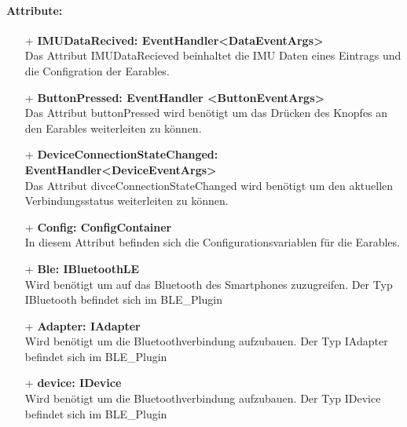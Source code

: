\documentclass[a4paper,12pt]{article}
\begin{document}
\paragraph{Attribute:}
\begin{itemize}
	\item[+] \textbf{IMUDataRecived: EventHandler<DataEventArgs>}\\Das Attribut IMUDataRecieved beinhaltet die IMU Daten eines Eintrags und die Configration der Earables.
	\item[+] \textbf{ButtonPressed: EventHandler <ButtonEventArgs>}\\ Das Attribut buttonPressed wird benötigt um das Drücken des Knopfes an den Earables weiterleiten zu können.
	\item[+] \textbf{DeviceConnectionStateChanged: EventHandler<DeviceEventArgs>}\\ Das Attribut divceConnectionStateChanged wird benötigt um den aktuellen Verbindungsstatus weiterleiten zu können.
	\item[+] \textbf{Config: ConfigContainer}\\ In diesem Attribut befinden sich die Configurationsvariablen für die Earables.
	\item[+] \textbf{Ble: IBluetoothLE}\\ Wird benötigt um auf das Bluetooth des Smartphones zuzugreifen. Der Typ IBluetooth befindet sich im BLE\_Plugin
	\item[+] \textbf{Adapter: IAdapter}\\ Wird benötigt um die Bluetoothverbindung aufzubauen. Der Typ  IAdapter befindet sich im BLE\_Plugin
	\item[+] \textbf{device: IDevice}\\ Wird benötigt um die Bluetoothverbindung aufzubauen. Der Typ  IDevice befindet sich im BLE\_Plugin
\end{itemize}
\end{document}
